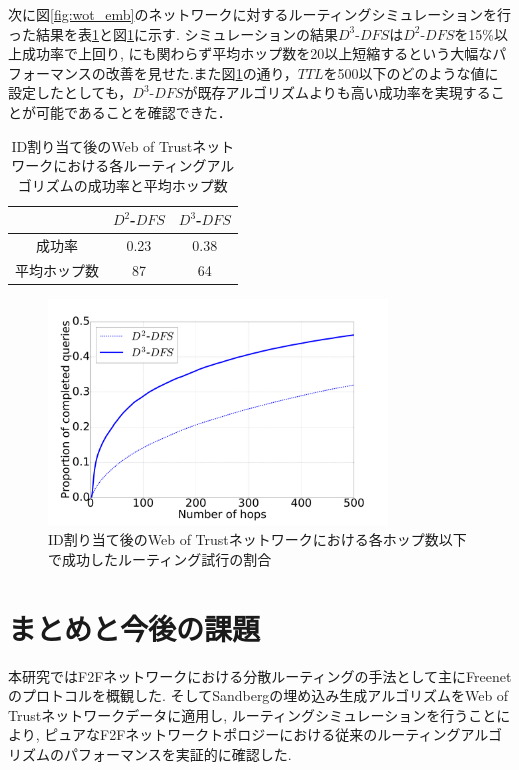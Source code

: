 \documentclass[technicalreport]{./ieicej-v3.0/UTF/ieicej}
\begin{document}
   次に図\ref{fig:wot_emb}のネットワークに対するルーティングシミュレーションを行った結果を表\ref{table:succ_hops_full}と図\ref{fig:simple_cml_noclip}に示す.  シミュレーションの結果$D^3$-$DFS$は$D^2$-$DFS$を15\%以上成功率で上回り, にも関わらず平均ホップ数を20以上短縮するという大幅なパフォーマンスの改善を見せた.また図\ref{fig:simple_cml_noclip}の通り，$TTL$を500以下のどのような値に設定したとしても，$D^3$-$DFS$が既存アルゴリズムよりも高い成功率を実現することが可能であることを確認できた．

  \begin{table}[htb]
   \begin{center}  
    \begin{tabular}{|c|c|c|} \hline
    & $D^2$-$DFS$ & $D^3$-$DFS$ \\ \hline
    成功率 & 0.23 & 0.38\\ \hline
    平均ホップ数 & 87 & 64\\ \hline
    \end{tabular}
   \end{center}
   \caption{ID割り当て後のWeb of Trustネットワークにおける各ルーティングアルゴリズムの成功率と平均ホップ数}
   \label{table:succ_hops_full}
  \end{table}
  \begin{figure}[htb]
   \centerline{\includegraphics[width=90mm]{../fig/simple_cml_noclip_gray.pdf}}
   \caption{ID割り当て後のWeb of Trustネットワークにおける各ホップ数以下で成功したルーティング試行の割合}
    \label{fig:simple_cml_noclip}
  \end{figure}

\section{まとめと今後の課題}
本研究ではF2Fネットワークにおける分散ルーティングの手法として主にFreenetのプロトコルを概観した. そしてSandbergの埋め込み生成アルゴリズムをWeb of Trustネットワークデータに適用し, ルーティングシミュレーションを行うことにより, ピュアなF2Fネットワークトポロジーにおける従来のルーティングアルゴリズムのパフォーマンスを実証的に確認した.
\end{document}
